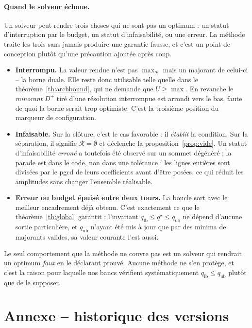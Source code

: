 \documentclass[11pt,a4paper]{article}
\theoremstyle{plain}
\theoremstyle{remark}
\newcommand{\Rcal}{\mathcal{R}}
\newcommand{\qs}{q^{\star}}
\begin{document}
\paragraph{Quand le solveur échoue.} Un solveur peut rendre trois choses
qui ne sont pas un optimum : un statut d'interruption par le budget, un
statut d'infaisabilité, ou une erreur. La méthode traite les trois sans
jamais produire une garantie fausse, et c'est un point de conception plutôt
qu'une précaution ajoutée après coup.
\begin{itemize}[leftmargin=1.4em]
\item \textbf{Interrompu.} La valeur rendue n'est pas $\max_{\Rcal}$ mais
  un majorant de celui-ci -- la borne duale. Elle reste donc utilisable
  telle quelle dans le théorème~\ref{th:archbound}, qui ne demande que
  $U\ge\max$. En revanche le \emph{minorant} $D^{+}$ tiré d'une résolution
  interrompue est arrondi vers le bas, faute de quoi la borne serait trop
  optimiste. C'est la troisième position du marqueur de configuration.
\item \textbf{Infaisable.} Sur la clôture, c'est le cas favorable : il
  \emph{établit} la condition. Sur la séparation, il signifie
  $\Rcal=\emptyset$ et déclenche la proposition~\ref{prop:vide}. Un statut
  d'infaisabilité \emph{erroné} a toutefois été observé sur un sommet
  dégénéré ; la parade est dans le code, non dans une tolérance :
  les lignes entières sont divisées par le pgcd de leurs coefficients
  avant d'être posées, ce qui réduit les amplitudes sans changer
  l'ensemble réalisable.
\item \textbf{Erreur ou budget épuisé entre deux tours.} La boucle sort
  avec le meilleur encadrement déjà obtenu. C'est exactement ce que le
  théorème~\ref{th:global} garantit : l'invariant
  $q_{\text{lb}}\le\qs\le q_{\text{ub}}$ ne dépend d'aucune sortie
  particulière, et $q_{\text{ub}}$ n'ayant été mis à jour que par des
  minima de majorants valides, sa valeur courante l'est aussi.
\end{itemize}
Le seul comportement que la méthode ne couvre pas est un solveur qui
rendrait un optimum \emph{faux} en le déclarant prouvé. Aucune méthode ne
s'en protège, et c'est la raison pour laquelle nos bancs vérifient
systématiquement $q_{\text{lb}}\le q_{\text{ub}}$ plutôt que de le supposer.
\section{Annexe -- historique des versions}
\label{sec:histo}
\end{document}
